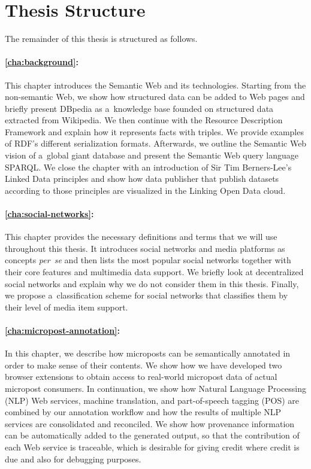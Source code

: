 \section{Thesis Structure}

The remainder of this thesis is structured as follows. 

\paragraph{\autoref{cha:background}:}

This chapter introduces the Semantic Web and its technologies.
Starting from the non-semantic Web,
we show how structured data can be added to Web pages
and briefly present DBpedia as a~knowledge base
founded on structured data extracted from Wikipedia.
We then continue with the Resource Description Framework
and explain how it represents facts with triples.
We provide examples of RDF's different serialization formats.
Afterwards, we outline the Semantic Web vision of
a~global giant database and present the Semantic Web
query language SPARQL.
We close the chapter with an introduction of Sir Tim Berners-Lee's
Linked Data principles and show how data publisher that publish
datasets according to those principles are visualized in the
Linking Open Data cloud.

\paragraph{\autoref{cha:social-networks}:}

This chapter provides the necessary definitions and terms
that we will use throughout this thesis. 
It introduces social networks and media platforms as concepts
\emph{per~se} and then lists the most popular social networks
together with their core features and multimedia data support.
We briefly look at decentralized social networks and explain
why we do not consider them in this thesis.
Finally, we propose a~classification scheme for social networks
that classifies them by their level of media item support.

\paragraph{\autoref{cha:micropost-annotation}:}

In this chapter, we describe how microposts can be semantically annotated
in order to make sense of their contents.
We show how we have developed two browser extensions to obtain access
to real-world micropost data of actual micropost consumers.
In continuation, we show how Natural Language Processing (NLP)
Web services, machine translation, and part-of-speech tagging (POS)
are combined by our annotation workflow
and how the results of multiple NLP services are consolidated and reconciled.
We show how provenance information can be automatically added
to the generated output, so that the contribution of each Web service
is traceable, which is desirable for giving credit where credit is due
and also for debugging purposes.

